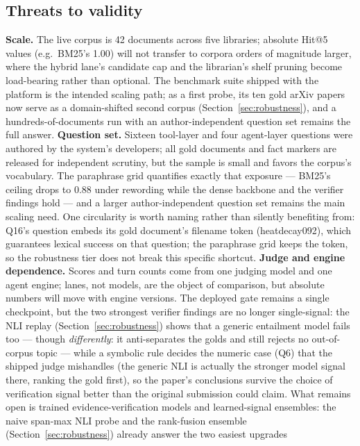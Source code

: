\documentclass[preprint,12pt]{elsarticle}
\begin{document}
\subsection{Threats to validity}
\label{sec:threats}
\textbf{Scale.} The live corpus is 42 documents across five libraries;
absolute Hit@5 values (e.g.\ BM25's 1.00) will not transfer to corpora
orders of magnitude larger, where the hybrid lane's candidate cap and the
librarian's shelf pruning become load-bearing rather than optional. The
benchmark suite shipped with the platform is the intended scaling path;
as a first probe, its ten gold arXiv papers now serve as a domain-shifted
second corpus (Section~\ref{sec:robustness}), and a
hundreds-of-documents run with an author-independent question set remains
the full answer.
\textbf{Question set.} Sixteen tool-layer and four agent-layer questions
were authored by the system's developers; all gold documents and fact
markers are released for independent scrutiny, but the sample is small and
favors the corpus's vocabulary. The paraphrase grid quantifies exactly
that exposure --- BM25's ceiling drops to 0.88 under rewording while the
dense backbone and the verifier findings hold --- and a larger
author-independent question set remains the main scaling need. One
circularity is worth naming rather than silently benefiting from: Q16's
question embeds its gold document's filename token (heatdecay092), which
guarantees lexical success on that question; the paraphrase grid keeps
the token, so the robustness tier does not break this specific shortcut.
\textbf{Judge and engine dependence.} Scores and turn counts come from one
judging model and one agent engine; lanes, not models, are the object of
comparison, but absolute numbers will move with engine versions. The
deployed gate remains a single checkpoint, but the two strongest
verifier findings are no longer single-signal: the NLI replay
(Section~\ref{sec:robustness}) shows that a generic entailment model
fails too --- though \emph{differently}: it anti-separates the golds and
still rejects no out-of-corpus topic --- while a symbolic rule decides
the numeric case (Q6) that the shipped judge mishandles (the generic NLI
is actually the stronger model signal there, ranking the gold first), so
the paper's conclusions survive the choice of verification
signal better than the original submission could claim. What remains
open is trained evidence-verification models and learned-signal
ensembles: the naive span-max NLI probe and the rank-fusion ensemble
(Section~\ref{sec:robustness}) already answer the two easiest upgrades
\end{document}
